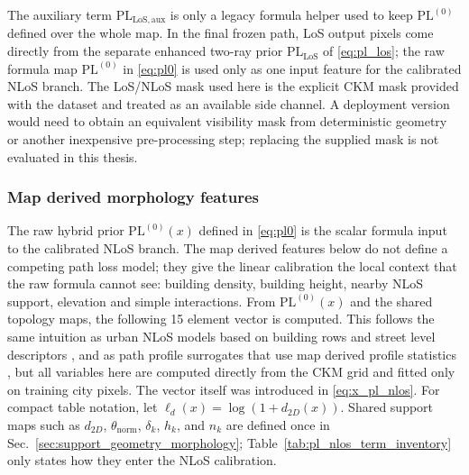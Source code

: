 The auxiliary term \(\mathrm{PL}_{\mathrm{LoS,aux}}\) is only a legacy formula
helper used to keep \(\mathrm{PL}^{(0)}\) defined over the whole map. In the
final frozen path, LoS output pixels come directly from the separate enhanced
two-ray prior \(\mathrm{PL}_{\mathrm{LoS}}\) of \eqref{eq:pl_los}; the raw
formula map \(\mathrm{PL}^{(0)}\) in \eqref{eq:pl0} is used only as one input
feature for the calibrated NLoS branch.
The LoS/NLoS mask used here is the explicit CKM mask provided with the
dataset and treated as an available side channel. A deployment version would
need to obtain an equivalent visibility mask from deterministic geometry or
another inexpensive pre-processing step; replacing the supplied mask is not
evaluated in this thesis.

\subsubsection{Map derived morphology features}

The raw hybrid prior $\mathrm{PL}^{(0)}(x)$ defined in \eqref{eq:pl0} is the
scalar formula input to the calibrated NLoS branch. The map derived features
below do not define a competing path loss model; they give the linear
calibration the local context that the raw formula cannot see: building
density, building height, nearby NLoS support, elevation and simple
interactions. From $\mathrm{PL}^{(0)}(x)$ and the shared topology maps, the
following 15 element vector is computed. This follows the same intuition as
urban NLoS models based on building rows and
street level descriptors \cite{walfisch1988,ikegami1984}, and as path profile
surrogates that use map derived profile statistics \cite{juang2021pathprofile},
but all variables here are computed directly from the CKM grid and fitted only
on training city pixels.
The vector itself was introduced in \eqref{eq:x_pl_nlos}. For compact table
notation, let \(\ell_d(x)=\log(1+d_{2D}(x))\). Shared support maps such as
\(d_{2D}\), \(\theta_{\mathrm{norm}}\), \(\delta_k\), \(h_k\), and \(n_k\) are
defined once in Sec.~\ref{sec:support_geometry_morphology};
Table~\ref{tab:pl_nlos_term_inventory} only states how they enter the NLoS
calibration.

